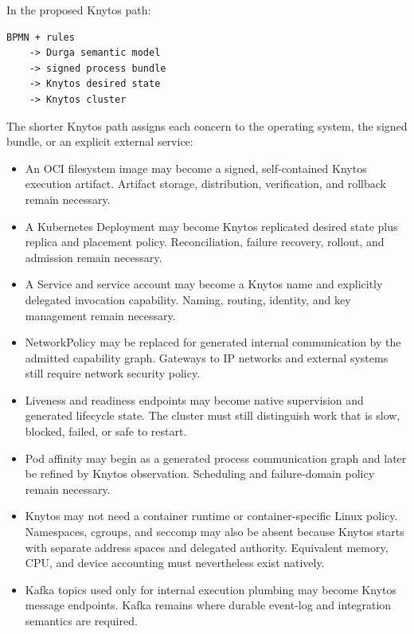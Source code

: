 In the proposed Knytos path:

\begin{verbatim}
BPMN + rules
    -> Durga semantic model
    -> signed process bundle
    -> Knytos desired state
    -> Knytos cluster
\end{verbatim}

The shorter Knytos path assigns each concern to the operating system, the
signed bundle, or an explicit external service:

\begin{itemize}
    \item An OCI filesystem image may become a signed, self-contained Knytos
        execution artifact. Artifact storage, distribution, verification, and
        rollback remain necessary.

    \item A Kubernetes Deployment may become Knytos replicated desired state
        plus replica and placement policy. Reconciliation, failure recovery,
        rollout, and admission remain necessary.

    \item A Service and service account may become a Knytos name and
        explicitly delegated invocation capability. Naming, routing, identity,
        and key management remain necessary.

    \item NetworkPolicy may be replaced for generated internal communication by
        the admitted capability graph. Gateways to IP networks and external
        systems still require network security policy.

    \item Liveness and readiness endpoints may become native supervision and
        generated lifecycle state. The cluster must still distinguish work
        that is slow, blocked, failed, or safe to restart.

    \item Pod affinity may begin as a generated process communication graph and
        later be refined by Knytos observation. Scheduling and failure-domain
        policy remain necessary.

    \item Knytos may not need a container runtime or container-specific
        Linux policy. Namespaces, cgroups, and seccomp may also be absent because
        Knytos starts with separate address spaces and delegated authority.
        Equivalent memory, CPU, and device accounting must nevertheless exist
        natively.

    \item Kafka topics used only for internal execution plumbing may become
        Knytos message endpoints. Kafka remains where durable event-log and
        integration semantics are required.
\end{itemize}

